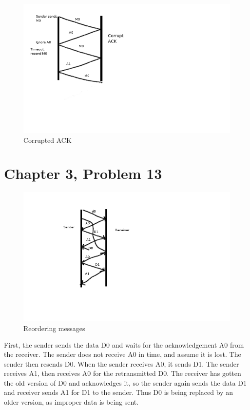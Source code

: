 \documentclass{article}
\begin{document}
\begin{figure}[h!]
\centering
\includegraphics[scale=0.5]{P9b.png}
\caption{Corrupted ACK}
\end{figure}
\clearpage
\section*{Chapter 3, Problem 13}

\begin{figure}[h!]
\centering
\includegraphics[scale=0.5]{P13.png}
\caption{Reordering messages}
\end{figure}
First, the sender sends the data D0 and waits for the acknowledgement A0 from the receiver.  The sender does not receive A0 in time, and assume it is lost.  The sender then resends D0.  When the sender receives A0, it sends D1.  The sender receives A1, then receives A0 for the retransmitted D0.  The receiver has gotten the old version of D0 and acknowledges it, so the sender again sends the data D1 and receiver sends A1 for D1 to the sender.  Thus D0 is being replaced by an older version, as improper data is being sent.\\
\end{document}
